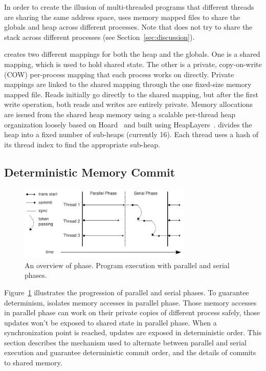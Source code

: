 In order to create the illusion of multi-threaded programs that
different threads are sharing the same address space, \dthreads{} uses
memory mapped files to share the globals and heap across different
processes. Note that \dthreads{} does not try to share the stack across
different processes (see Section~\ref{sec:discussion}).

\dthreads{} creates two different mappings for both the heap and the
globals.  One is a shared mapping, which is used to hold shared state.
The other is a private, copy-on-write (COW) per-process mapping that
each process works on directly.  Private mappings are linked to the
shared mapping through the one fixed-size memory mapped file.
Reads initially go directly to the shared mapping,
but after the first write operation,
both reads and writes are entirely private.
Memory allocations are issued from the shared heap memory using a scalable per-thread heap organization loosely based on Hoard~\cite{BergerMcKinleyBlumofeWilson:ASPLOS2000} and built using HeapLayers~\cite{BergerZornMcKinley:2001}.  \dthreads{} divides the heap into a fixed number of sub-heaps (currently 16).  Each thread uses a hash of its thread index to find the appropriate sub-heap.

\subsection{Deterministic Memory Commit}
\label{sec:sharedmem}

\begin{figure}
{\centering 
\includegraphics[width=3.25in]{dthreads/figure/phase}
\caption{An overview of \dthreads{} phase. Program execution with \dthreads{} parallel and serial phases.\label{fig:phase}}
}
\end{figure}

Figure~\ref{fig:phase} illustrates the progression of parallel and serial phases. 
To guarantee determinism, \dthreads{} isolates memory accesses in parallel phase. Those memory accesses in
parallel phase can work on their private copies of different process safely, those updates won't be exposed to 
shared state in parallel phase.
When a synchronization point is reached, updates are exposed in deterministic order.  
This section describes the mechanism used to alternate between parallel and serial execution 
and guarantee deterministic commit order, and the details of commits to shared memory.

